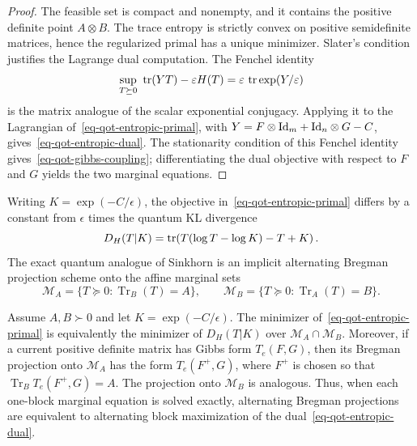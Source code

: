 \begin{proof}
	The feasible set is compact and nonempty, and it contains the positive definite point $A\otimes B$. The trace entropy is strictly convex on positive semidefinite matrices, hence the regularized primal has a unique minimizer. Slater's condition justifies the Lagrange dual computation. The Fenchel identity
	\[
		\sup_{T\succeq0}\ \operatorname{tr}(YT)-\varepsilon H(T)
		=
		\varepsilon\,\operatorname{tr}\exp(Y/\varepsilon)
	\]
	is the matrix analogue of the scalar exponential conjugacy. Applying it to the Lagrangian of~\eqref{eq-qot-entropic-primal}, with
	$Y=F\otimes\mathrm{Id}_m+\mathrm{Id}_n\otimes G-C$, gives~\eqref{eq-qot-entropic-dual}. The stationarity condition of this Fenchel identity gives~\eqref{eq-qot-gibbs-coupling}; differentiating the dual objective with respect to $F$ and $G$ yields the two marginal equations.
\end{proof}

Writing $K=\exp(-C/\epsilon)$, the objective in~\eqref{eq-qot-entropic-primal} differs by a constant from $\epsilon$ times the quantum KL divergence
\[
	D_H(T|K)
	=
	\operatorname{tr}\!\left(T(\log T-\log K)-T+K\right).
\]
The exact quantum analogue of Sinkhorn is an implicit alternating Bregman projection scheme onto the affine marginal sets
\[
	\mathcal M_A=\{T\succeq0:\operatorname{Tr}_B(T)=A\},
	\qquad
	\mathcal M_B=\{T\succeq0:\operatorname{Tr}_A(T)=B\}.
\]

\begin{prop}\label{prop-qot-bregman-projections}
	Assume $A,B\succ0$ and let $K=\exp(-C/\epsilon)$. The minimizer of~\eqref{eq-qot-entropic-primal} is equivalently the minimizer of $D_H(T|K)$ over $\mathcal M_A\cap\mathcal M_B$. Moreover, if a current positive definite matrix has Gibbs form $T_e(F,G)$, then its Bregman projection onto $\mathcal M_A$ has the form $T_e(F^+,G)$, where $F^+$ is chosen so that $\operatorname{Tr}_B T_e(F^+,G)=A$. The projection onto $\mathcal M_B$ is analogous. Thus, when each one-block marginal equation is solved exactly, alternating Bregman projections are equivalent to alternating block maximization of the dual~\eqref{eq-qot-entropic-dual}.
\end{prop}

